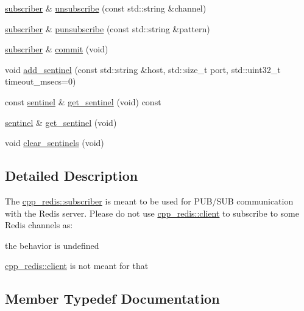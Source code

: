 \begin{DoxyCompactItemize}
\item 
\hyperlink{classcpp__redis_1_1subscriber}{subscriber} \& \hyperlink{classcpp__redis_1_1subscriber_a08dffea41cfd5914adfa5a966e0ab292}{unsubscribe} (const std\+::string \&channel)
\item 
\hyperlink{classcpp__redis_1_1subscriber}{subscriber} \& \hyperlink{classcpp__redis_1_1subscriber_a26edc7dcf87ddc8734fac04878ca307a}{punsubscribe} (const std\+::string \&pattern)
\item 
\hyperlink{classcpp__redis_1_1subscriber}{subscriber} \& \hyperlink{classcpp__redis_1_1subscriber_abbf600802ed93b82323185eec5719ecb}{commit} (void)
\item 
void \hyperlink{classcpp__redis_1_1subscriber_a2faf9e9cc9c95e3c0fed148355af84f1}{add\+\_\+sentinel} (const std\+::string \&host, std\+::size\+\_\+t port, std\+::uint32\+\_\+t timeout\+\_\+msecs=0)
\item 
const \hyperlink{classcpp__redis_1_1sentinel}{sentinel} \& \hyperlink{classcpp__redis_1_1subscriber_a55a8906106adceca1faf6ab26e040f8a}{get\+\_\+sentinel} (void) const
\item 
\hyperlink{classcpp__redis_1_1sentinel}{sentinel} \& \hyperlink{classcpp__redis_1_1subscriber_ae883ef7e41753d5c1d819260d7574e4b}{get\+\_\+sentinel} (void)
\item 
void \hyperlink{classcpp__redis_1_1subscriber_ac8f371c14866842cdda7cf1ee5eee2b8}{clear\+\_\+sentinels} (void)
\end{DoxyCompactItemize}


\subsection{Detailed Description}
The \hyperlink{classcpp__redis_1_1subscriber}{cpp\+\_\+redis\+::subscriber} is meant to be used for P\+U\+B/\+S\+UB communication with the Redis server. Please do not use \hyperlink{classcpp__redis_1_1client}{cpp\+\_\+redis\+::client} to subscribe to some Redis channels as\+:
\begin{DoxyItemize}
\item the behavior is undefined
\item \hyperlink{classcpp__redis_1_1client}{cpp\+\_\+redis\+::client} is not meant for that 
\end{DoxyItemize}

\subsection{Member Typedef Documentation}
\mbox{\label{classcpp__redis_1_1subscriber_a19ea39dfabeb19937a9ce4c8d21781b4}} 
